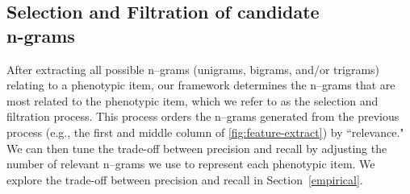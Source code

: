 \documentclass{sig-alternate}
\begin{document}



\subsection{Selection and Filtration of candidate \\n-grams}
After extracting all possible n--grams (unigrams, bigrams, and/or trigrams) relating to a phenotypic item, our framework determines the n--grams that are most related to the phenotypic item, which we refer to as the selection and filtration process.
This process orders the n--grams generated from the previous process (e.g., the first and middle column of \ref{fig:feature-extract}) by ``relevance." 
We can then tune the trade-off between precision and recall by adjusting the number of relevant n--grams we use to represent each phenotypic item. 
We explore the trade-off between precision and recall in Section~\ref{empirical}.
\end{document}
